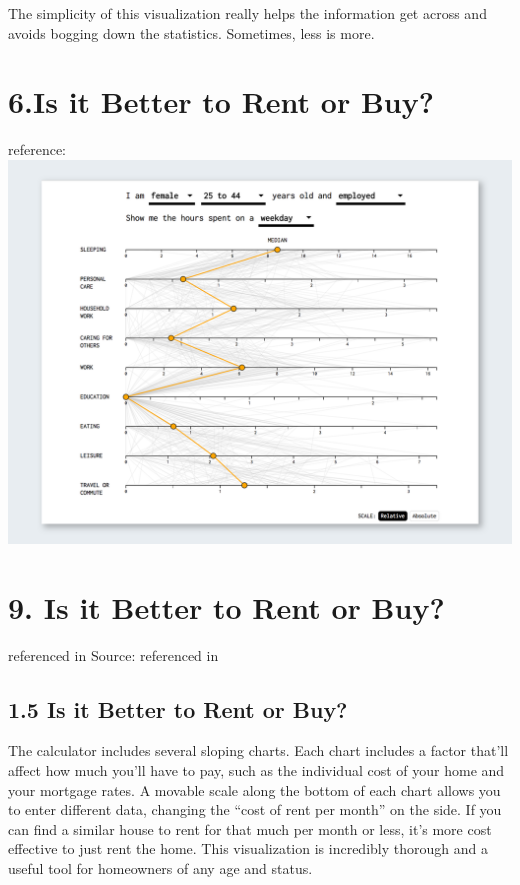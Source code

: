 \documentclass[]{book}
\theoremstyle{definition}
\theoremstyle{definition}
\theoremstyle{definition}
\theoremstyle{remark}
\begin{document}
The simplicity of this visualization really helps the information get
across and avoids bogging down the statistics. Sometimes, less is more.

\section{6.Is it Better to Rent or
Buy?}\label{is-it-better-to-rent-or-buy}

reference: \citep{rent_or_buy} \includegraphics{images/SpendingTime.png}

\section{9. Is it Better to Rent or
Buy?}\label{is-it-better-to-rent-or-buy-1}

\citep{rent_or_buy} referenced in \citep{cool_data} Source:
\citep{spendingtime} referenced in \citep{cool_data}

\subsection{1.5 Is it Better to Rent or
Buy?}\label{is-it-better-to-rent-or-buy-2}

The calculator includes several sloping charts. Each chart includes a
factor that'll affect how much you'll have to pay, such as the
individual cost of your home and your mortgage rates. A movable scale
along the bottom of each chart allows you to enter different data,
changing the ``cost of rent per month'' on the side. If you can find a
similar house to rent for that much per month or less, it's more cost
effective to just rent the home. This visualization is incredibly
thorough and a useful tool for homeowners of any age and status.
\end{document}
